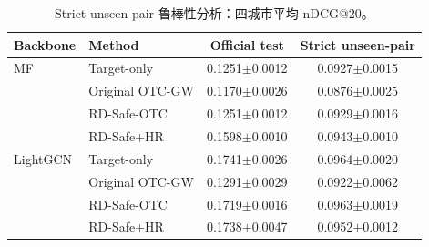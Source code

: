 \begin{table}[t]
\centering
\caption{Strict unseen-pair 鲁棒性分析：四城市平均 nDCG@20。}
\label{tab:strict}
\begin{tabular}{llcc}
\toprule
Backbone & Method & Official test & Strict unseen-pair \\
\midrule
MF & Target-only & 0.1251$\pm$0.0012 & 0.0927$\pm$0.0015 \\
 & Original OTC-GW & 0.1170$\pm$0.0026 & 0.0876$\pm$0.0025 \\
 & RD-Safe-OTC & 0.1251$\pm$0.0012 & 0.0929$\pm$0.0016 \\
 & RD-Safe+HR & 0.1598$\pm$0.0010 & 0.0943$\pm$0.0010 \\
\midrule
LightGCN & Target-only & 0.1741$\pm$0.0026 & 0.0964$\pm$0.0020 \\
 & Original OTC-GW & 0.1291$\pm$0.0029 & 0.0922$\pm$0.0062 \\
 & RD-Safe-OTC & 0.1719$\pm$0.0016 & 0.0963$\pm$0.0019 \\
 & RD-Safe+HR & 0.1738$\pm$0.0047 & 0.0952$\pm$0.0012 \\
\bottomrule
\end{tabular}
\end{table}